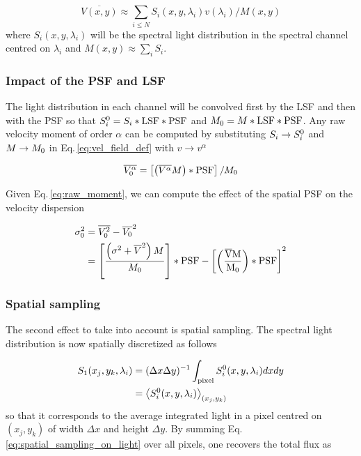\begin{equation}
	\overline{V(x,y)} \approx \sum_{i \leq N} S_i(x,y,\lambda_i) v(\lambda_i) / M(x, y)
	\label{eq:vel_field_def_sampled}
\end{equation}
where $S_i(x,y,\lambda_i)$ will be the spectral light distribution in the spectral channel centred on $\lambda_i$ and $M(x,y) \approx \sum_i S_i$.


\subsubsection{Impact of the PSF and LSF}
\label{sec:impact_PSF}

The light distribution in each channel will be convolved first by the LSF and then with the PSF so that $S_i^{\rm{0}} = S_i * \rm{LSF} * \rm{PSF}$ and $M_{\rm{0}} = M * \rm{LSF} * \rm{PSF}$. Any raw velocity moment of order $\alpha$ can be computed by substituting $S_i \rightarrow S_i^{\rm{0}}$ and $M \rightarrow M_{\rm{0}}$ in Eq.\,\ref{eq:vel_field_def} with $v \rightarrow v^{\alpha}$

\begin{equation}
	\overline{V_0^{\alpha}} = \left [ \left ( \overline{V^{\alpha}} M \right ) * \rm{PSF} \right ] / M_0
	\label{eq:raw_moment}
\end{equation}

Given Eq.\,\ref{eq:raw_moment}, we can compute the effect of the spatial PSF on the velocity dispersion

\begin{equation}
	\begin{split}
		\sigma_0^2 & = \overline{V_0^2} - \overline{V_0}^2 \\
		& = \left [ \frac{\left ( \sigma^2 + \overline{V}^2 \right ) M}{M_0} \right ] * \rm{PSF} - \left [ \left (  \frac{\overline{V} M}{ M_0} \right ) * \rm{PSF} \right ]^2
	\end{split}
\end{equation}

\subsubsection{Spatial sampling}
\label{sec:spatial_sampling}

The second effect to take into account is spatial sampling. The spectral light distribution is now spatially discretized as follows

\begin{equation}
	\begin{split}
		S_1 ( x_j , y_k , \lambda_i ) & = (\Delta x \Delta y)^{-1}\int_{\rm{pixel}} S_i^0 (x, y, \lambda_i) dx dy \\
		& = \left \langle S_i^0 (x, y, \lambda_i) \right \rangle_{(x_j , y_k)}
		\label{eq:spatial_sampling_on_light}
	\end{split}
\end{equation}
so that it corresponds to the average integrated light in a pixel centred on $(x_j , y_k)$ of width $\Delta x$ and height $\Delta y$. By summing Eq.\,\ref{eq:spatial_sampling_on_light} over all pixels, one recovers the total flux as

